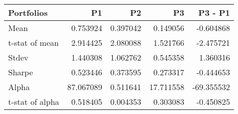 \begin{tabular}{lrrrr}
\toprule
Portfolios & P1 & P2 & P3 & P3 - P1 \\
\midrule
Mean & 0.753924 & 0.397042 & 0.149056 & -0.604868 \\
t-stat of mean & 2.914425 & 2.080088 & 1.521766 & -2.475721 \\
Stdev & 1.440308 & 1.062762 & 0.545358 & 1.360316 \\
Sharpe & 0.523446 & 0.373595 & 0.273317 & -0.444653 \\
Alpha & 87.067089 & 0.511641 & 17.711558 & -69.355532 \\
t-stat of alpha & 0.518405 & 0.004353 & 0.303083 & -0.450825 \\
\bottomrule
\end{tabular}
